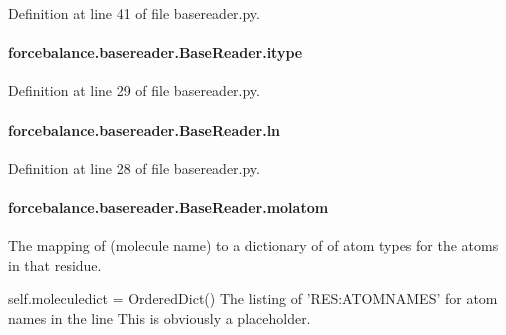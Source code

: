Definition at line 41 of file basereader.\-py.

\hypertarget{classforcebalance_1_1basereader_1_1BaseReader_a0c5b4d7b1c87dbcc9a8a0fdc82eee023}{
\paragraph[{itype}]{\setlength{\rightskip}{0pt plus 5cm}forcebalance.\-basereader.\-Base\-Reader.\-itype}}\label{classforcebalance_1_1basereader_1_1BaseReader_a0c5b4d7b1c87dbcc9a8a0fdc82eee023}


Definition at line 29 of file basereader.\-py.

\hypertarget{classforcebalance_1_1basereader_1_1BaseReader_ab04436f3968d9bd6ec09238ee6537ec6}{
\paragraph[{ln}]{\setlength{\rightskip}{0pt plus 5cm}forcebalance.\-basereader.\-Base\-Reader.\-ln}}\label{classforcebalance_1_1basereader_1_1BaseReader_ab04436f3968d9bd6ec09238ee6537ec6}


Definition at line 28 of file basereader.\-py.

\hypertarget{classforcebalance_1_1basereader_1_1BaseReader_a56e6e6024825ada94ab24f5f3ce59851}{
\paragraph[{molatom}]{\setlength{\rightskip}{0pt plus 5cm}forcebalance.\-basereader.\-Base\-Reader.\-molatom}}\label{classforcebalance_1_1basereader_1_1BaseReader_a56e6e6024825ada94ab24f5f3ce59851}


The mapping of (molecule name) to a dictionary of of atom types for the atoms in that residue. 

self.\-moleculedict = Ordered\-Dict() The listing of 'R\-E\-S\-:A\-T\-O\-M\-N\-A\-M\-E\-S' for atom names in the line This is obviously a placeholder. 

